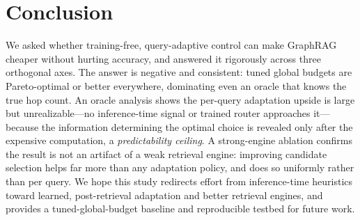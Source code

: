 \section{Conclusion}
\label{sec:conclusion}

We asked whether training-free, query-adaptive control can make GraphRAG cheaper without hurting accuracy, and answered it rigorously across three orthogonal axes. The answer is negative and consistent: tuned global budgets are Pareto-optimal or better everywhere, dominating even an oracle that knows the true hop count. An oracle analysis shows the per-query adaptation upside is large but unrealizable---no inference-time signal or trained router approaches it---because the information determining the optimal choice is revealed only after the expensive computation, a \emph{predictability ceiling}. A strong-engine ablation confirms the result is not an artifact of a weak retrieval engine: improving candidate selection helps far more than any adaptation policy, and does so uniformly rather than per query. We hope this study redirects effort from inference-time heuristics toward learned, post-retrieval adaptation and better retrieval engines, and provides a tuned-global-budget baseline and reproducible testbed for future work.
